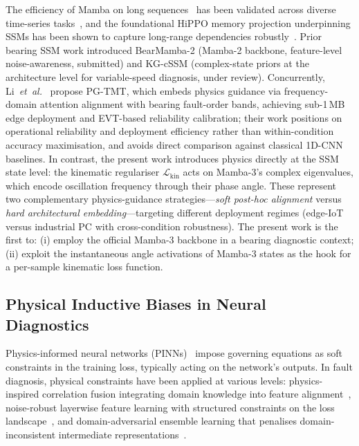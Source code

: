 The efficiency of Mamba on long sequences~\cite{gu2023mamba,mamba2} has
been validated across diverse time-series tasks~\cite{mamba_fault_2024},
and the foundational HiPPO memory projection underpinning SSMs has been
shown to capture long-range dependencies robustly~\cite{mamba_fault2_2025}.
Prior bearing SSM work introduced BearMamba-2 (Mamba-2 backbone,
feature-level noise-awareness, submitted) and KG-cSSM (complex-state priors
at the architecture level for variable-speed diagnosis, under review).
Concurrently, Li~\textit{et~al.}~\cite{li2026pgtmt} propose PG-TMT,
which embeds physics guidance via frequency-domain attention alignment with
bearing fault-order bands, achieving sub-1\,MB edge deployment and EVT-based
reliability calibration; their work positions on operational reliability
and deployment efficiency rather than within-condition accuracy
maximisation, and avoids direct comparison against classical 1D-CNN
baselines.
In contrast, the present work introduces physics directly at the SSM
state level: the kinematic regulariser $\mathcal{L}_{\text{kin}}$ acts on
Mamba-3's complex eigenvalues, which encode oscillation frequency through
their phase angle.
These represent two complementary physics-guidance
strategies---\emph{soft post-hoc alignment} versus \emph{hard
architectural embedding}---targeting different deployment regimes
(edge-IoT versus industrial PC with cross-condition robustness).
The present work is the first to: (i) employ the official Mamba-3 backbone
in a bearing diagnostic context; (ii) exploit the instantaneous angle
activations of Mamba-3 states as the hook for a per-sample kinematic
loss function.

\subsection{Physical Inductive Biases in Neural Diagnostics}
\label{subsec:rel_physics}

Physics-informed neural networks (PINNs)~\cite{raissi2019physics,willard2022physics}
impose governing equations as soft constraints in the training loss, typically
acting on the network's outputs.
In fault diagnosis, physical constraints have been applied at various levels:
physics-inspired correlation fusion integrating domain knowledge into feature
alignment~\cite{chen2022physics_diag},
noise-robust layerwise feature learning with structured constraints on the
loss landscape~\cite{spectrum_reg_2023},
and domain-adversarial ensemble learning that penalises domain-inconsistent
intermediate representations~\cite{complexval_fault}.

